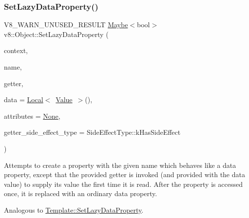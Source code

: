 \subsubsection{\texorpdfstring{Set\+Lazy\+Data\+Property()}{SetLazyDataProperty()}}
{\footnotesize\ttfamily V8\+\_\+\+W\+A\+R\+N\+\_\+\+U\+N\+U\+S\+E\+D\+\_\+\+R\+E\+S\+U\+LT \mbox{\hyperlink{classv8_1_1Maybe}{Maybe}}$<$bool$>$ v8\+::\+Object\+::\+Set\+Lazy\+Data\+Property (\begin{DoxyParamCaption}\item[{\mbox{\hyperlink{classv8_1_1Local}{Local}}$<$ \mbox{\hyperlink{classv8_1_1Context}{Context}} $>$}]{context,  }\item[{\mbox{\hyperlink{classv8_1_1Local}{Local}}$<$ \mbox{\hyperlink{classv8_1_1Name}{Name}} $>$}]{name,  }\item[{Accessor\+Name\+Getter\+Callback}]{getter,  }\item[{\mbox{\hyperlink{classv8_1_1Local}{Local}}$<$ \mbox{\hyperlink{classv8_1_1Value}{Value}} $>$}]{data = {\ttfamily \mbox{\hyperlink{classv8_1_1Local}{Local}}$<$~\mbox{\hyperlink{classv8_1_1Value}{Value}}~$>$()},  }\item[{\mbox{\hyperlink{namespacev8_a05f25f935e108a1ea2d150e274602b87}{Property\+Attribute}}}]{attributes = {\ttfamily \mbox{\hyperlink{namespacev8_a05f25f935e108a1ea2d150e274602b87a7ab4d58719c33b3ea2dfaefa29b111df}{None}}},  }\item[{\mbox{\hyperlink{namespacev8_a29711319c2b9fc7716d65faee2f7b9cb}{Side\+Effect\+Type}}}]{getter\+\_\+side\+\_\+effect\+\_\+type = {\ttfamily SideEffectType\+:\+:kHasSideEffect} }\end{DoxyParamCaption})}

Attempts to create a property with the given name which behaves like a data property, except that the provided getter is invoked (and provided with the data value) to supply its value the first time it is read. After the property is accessed once, it is replaced with an ordinary data property.

Analogous to \mbox{\hyperlink{classv8_1_1Template_a983acad576914228a522965fac87c786}{Template\+::\+Set\+Lazy\+Data\+Property}}. \mbox{\label{classv8_1_1Object_a4496e25c9bb20a3181c603040029a7fc}} 
